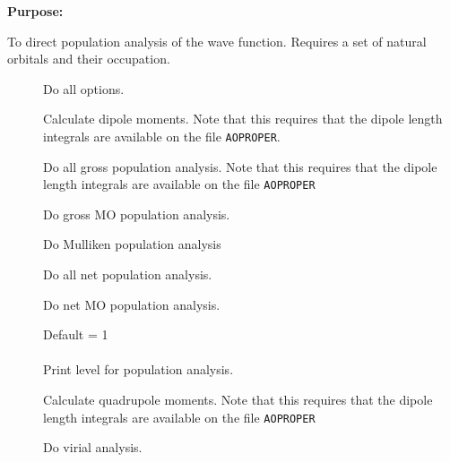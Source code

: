 {\bf Purpose:}

To direct population analysis of the wave function.
Requires a set of natural orbitals and their occupation.

\begin{description}
\item[]
  Do all options.

\item[]
  Calculate dipole moments. Note that this requires that the dipole
  length integrals are available on the file \verb|AOPROPER|.

\item[]
  Do all gross population analysis. Note that this requires that the dipole
  length integrals are available on the file \verb|AOPROPER|

\item[]
  Do gross MO population analysis.

\item[]
  Do Mulliken population analysis

\item[]
  Do all net population analysis.

\item[]
  Do net MO population analysis.

\item[]
  Default = 1\\
   \\
  Print level for population analysis.

\item[]
  Calculate quadrupole moments. Note that this requires that the dipole
  length integrals are available on the file \verb|AOPROPER|

\item[]
  Do virial analysis.
\end{description}

\pagebreak[3]
\subsection{\label{ref-priinp}}

